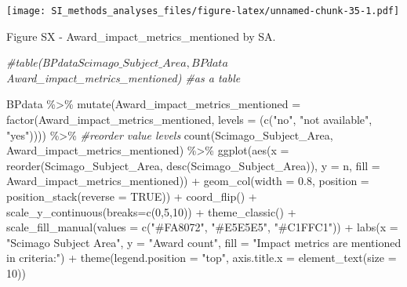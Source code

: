 \documentclass[
]{article}
\newenvironment{Shaded}{\begin{snugshade}}{\end{snugshade}}
\newcommand{\AttributeTok}[1]{\textcolor[rgb]{0.77,0.63,0.00}{#1}}
\newcommand{\CommentTok}[1]{\textcolor[rgb]{0.56,0.35,0.01}{\textit{#1}}}
\newcommand{\ConstantTok}[1]{\textcolor[rgb]{0.00,0.00,0.00}{#1}}
\newcommand{\DecValTok}[1]{\textcolor[rgb]{0.00,0.00,0.81}{#1}}
\newcommand{\FloatTok}[1]{\textcolor[rgb]{0.00,0.00,0.81}{#1}}
\newcommand{\FunctionTok}[1]{\textcolor[rgb]{0.00,0.00,0.00}{#1}}
\newcommand{\NormalTok}[1]{#1}
\newcommand{\SpecialCharTok}[1]{\textcolor[rgb]{0.00,0.00,0.00}{#1}}
\newcommand{\StringTok}[1]{\textcolor[rgb]{0.31,0.60,0.02}{#1}}
\begin{document}
\texttt{[image: SI\_methods\_analyses\_files/figure-latex/unnamed-chunk-35-1.pdf]}

Figure SX - Award\_impact\_metrics\_mentioned by SA.

\begin{Shaded}
\begin{Highlighting}[]
\CommentTok{\#table(BPdata$Scimago\_Subject\_Area, BPdata$Award\_impact\_metrics\_mentioned) \#as a table}

\NormalTok{BPdata }\SpecialCharTok{\%\textgreater{}\%} 
    \FunctionTok{mutate}\NormalTok{(}\AttributeTok{Award\_impact\_metrics\_mentioned =} \FunctionTok{factor}\NormalTok{(Award\_impact\_metrics\_mentioned, }\AttributeTok{levels =}\NormalTok{ (}\FunctionTok{c}\NormalTok{(}\StringTok{"no"}\NormalTok{, }\StringTok{"not available"}\NormalTok{, }\StringTok{"yes"}\NormalTok{)))) }\SpecialCharTok{\%\textgreater{}\%} \CommentTok{\#reorder value levels}
    \FunctionTok{count}\NormalTok{(Scimago\_Subject\_Area, Award\_impact\_metrics\_mentioned) }\SpecialCharTok{\%\textgreater{}\%}
    \FunctionTok{ggplot}\NormalTok{(}\FunctionTok{aes}\NormalTok{(}\AttributeTok{x =} \FunctionTok{reorder}\NormalTok{(Scimago\_Subject\_Area, }\FunctionTok{desc}\NormalTok{(Scimago\_Subject\_Area)), }\AttributeTok{y =}\NormalTok{ n, }\AttributeTok{fill =}\NormalTok{ Award\_impact\_metrics\_mentioned)) }\SpecialCharTok{+} 
    \FunctionTok{geom\_col}\NormalTok{(}\AttributeTok{width =} \FloatTok{0.8}\NormalTok{, }\AttributeTok{position =} \FunctionTok{position\_stack}\NormalTok{(}\AttributeTok{reverse =} \ConstantTok{TRUE}\NormalTok{)) }\SpecialCharTok{+}
    \FunctionTok{coord\_flip}\NormalTok{() }\SpecialCharTok{+}
    \FunctionTok{scale\_y\_continuous}\NormalTok{(}\AttributeTok{breaks=}\FunctionTok{c}\NormalTok{(}\DecValTok{0}\NormalTok{,}\DecValTok{5}\NormalTok{,}\DecValTok{10}\NormalTok{)) }\SpecialCharTok{+}
    \FunctionTok{theme\_classic}\NormalTok{() }\SpecialCharTok{+} 
    \FunctionTok{scale\_fill\_manual}\NormalTok{(}\AttributeTok{values =} \FunctionTok{c}\NormalTok{(}\StringTok{"\#FA8072"}\NormalTok{, }\StringTok{"\#E5E5E5"}\NormalTok{, }\StringTok{"\#C1FFC1"}\NormalTok{)) }\SpecialCharTok{+}
    \FunctionTok{labs}\NormalTok{(}\AttributeTok{x =} \StringTok{"Scimago Subject Area"}\NormalTok{, }\AttributeTok{y =} \StringTok{"Award count"}\NormalTok{, }\AttributeTok{fill =} \StringTok{"Impact metrics are mentioned in criteria:"}\NormalTok{) }\SpecialCharTok{+} 
    \FunctionTok{theme}\NormalTok{(}\AttributeTok{legend.position =} \StringTok{"top"}\NormalTok{, }\AttributeTok{axis.title.x =} \FunctionTok{element\_text}\NormalTok{(}\AttributeTok{size =} \DecValTok{10}\NormalTok{))}
\end{Highlighting}
\end{Shaded}
\end{document}
